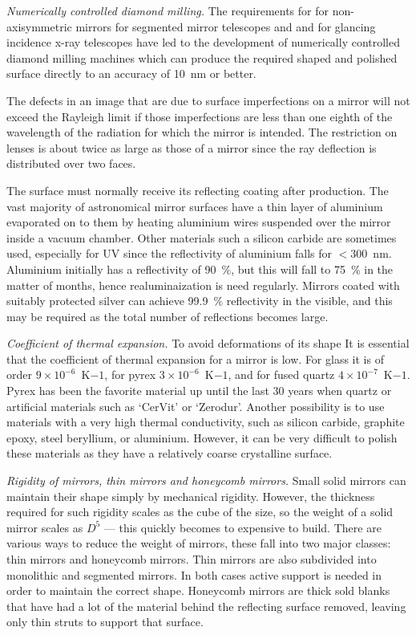 \noindent
{\it Numerically controlled diamond milling.} The requirements for for non-axisymmetric
mirrors for segmented mirror telescopes and and for glancing incidence x-ray telescopes
have led to the development of numerically controlled diamond milling machines which 
can produce the required shaped and polished surface directly to an accuracy of 10~nm or
better.

The defects in an image that are due to surface imperfections on a mirror will
not exceed the Rayleigh limit if those imperfections are less than 
one eighth of the wavelength of the radiation for which the mirror is intended.
The restriction on lenses is about twice as large as those of a mirror
since the ray deflection is distributed over two faces. 

The surface must normally receive its reflecting coating after production. The
vast majority of astronomical mirror surfaces have a thin layer of aluminium
evaporated on to them by heating aluminium wires suspended over the mirror 
inside a vacuum chamber. Other materials such a silicon carbide are sometimes
used, especially for UV since the reflectivity of aluminium falls for 
$<300$~nm. Aluminium initially has a reflectivity of 90~\%, but this will
fall to 75~\% in the matter of months, hence realuminaization is need 
regularly. Mirrors coated with suitably protected silver can achieve 99.9~\%
reflectivity in the visible, and this may be required as the total number of
reflections becomes large.

\noindent
{\it Coefficient of thermal expansion.} To avoid deformations of its shape It is essential
that the coefficient of thermal expansion for a mirror is low. For glass it is of order
$9\times 10^{-6}$~K${-1}$, for pyrex $3\times 10^{-6}$~K${-1}$, and for fused quartz
$4\times 10^{-7}$~K${-1}$. Pyrex has been the favorite material up until the last 30 years
when quartz or artificial materials such as `CerVit' or `Zerodur'. Another possibility is to 
use materials with a very high thermal conductivity, such as silicon carbide, graphite epoxy,
steel beryllium, or aluminium. However, it can be very difficult to polish these materials as
they have a relatively coarse crystalline surface.

\noindent
{\it Rigidity of mirrors, thin mirrors and honeycomb mirrors.} Small solid mirrors can maintain
their shape simply by mechanical rigidity. However, the thickness required for such rigidity
scales as the cube of the size, so the weight of a solid mirror scales as $D^5$ --- this quickly 
becomes to expensive to build. There are various ways to reduce the weight of mirrors, these
fall into two major classes: thin mirrors and honeycomb mirrors. Thin mirrors are also subdivided
into monolithic and segmented mirrors. In both cases active support is needed in order to 
maintain the correct shape. Honeycomb mirrors are thick sold blanks that have had a lot of
the material behind the reflecting surface removed, leaving only thin struts to support that surface. 

